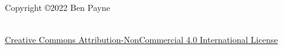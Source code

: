 \thispagestyle{empty}

Copyright \copyright 2022 Ben Payne

\ \\

\href{https://creativecommons.org/licenses/by-nc/4.0/}{Creative Commons Attribution-NonCommercial 4.0 International License}
